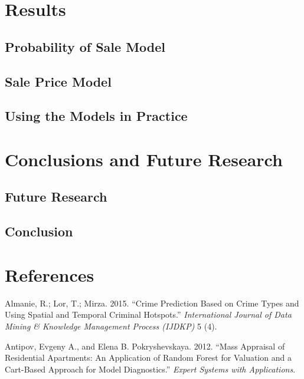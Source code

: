 \documentclass[]{article}
\begin{document}
\section{Results}\label{results}

\subsection{Probability of Sale Model}\label{probability-of-sale-model}

\subsection{Sale Price Model}\label{sale-price-model}

\subsection{Using the Models in
Practice}\label{using-the-models-in-practice}

\section{Conclusions and Future
Research}\label{conclusions-and-future-research}

\subsection{Future Research}\label{future-research}

\subsection{Conclusion}\label{conclusion}

\section*{References}\label{references}

\hypertarget{refs}{}
\hypertarget{ref-Almanie2015}{}
Almanie, R.; Lor, T.; Mirza. 2015. ``Crime Prediction Based on Crime
Types and Using Spatial and Temporal Criminal Hotspots.''
\emph{International Journal of Data Mining \& Knowledge Management
Process (IJDKP)} 5 (4).

\hypertarget{ref-antipov12}{}
Antipov, Evgeny A., and Elena B. Pokryshevskaya. 2012. ``Mass Appraisal
of Residential Apartments: An Application of Random Forest for Valuation
and a Cart-Based Approach for Model Diagnostics.'' \emph{Expert Systems
with Applications}.
\end{document}
